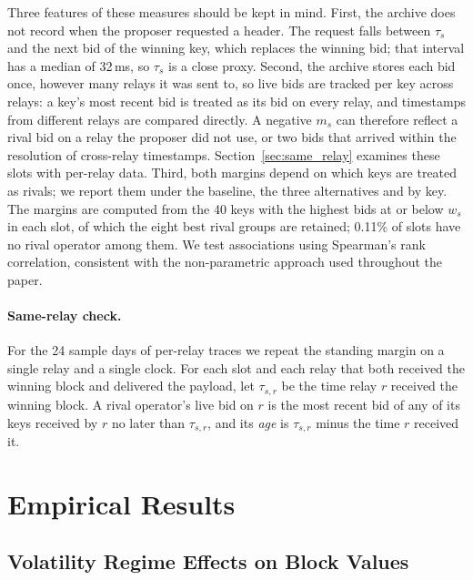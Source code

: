 \documentclass[11pt]{article}
\begin{document}
Three features of these measures should be kept in mind. First, the archive
does not record when the proposer requested a header. The request falls
between $\tau_s$ and the next bid of the winning key, which replaces the
winning bid; that interval has a median of 32\,ms, so $\tau_s$ is a close
proxy. Second, the archive stores each bid once, however many relays it was
sent to, so live bids are tracked per key across relays: a key's most recent
bid is treated as its bid on every relay, and timestamps from different
relays are compared directly. A negative $m_s$ can therefore reflect a rival
bid on a relay the proposer did not use, or two bids that arrived within the
resolution of cross-relay timestamps. Section~\ref{sec:same_relay} examines
these slots with per-relay data. Third, both margins depend on which keys
are treated as rivals; we report them under the baseline, the three
alternatives and by key. The margins are computed from the 40 keys with the
highest bids at or below $w_s$ in each slot, of which the eight best rival
groups are retained; 0.11\% of slots have no rival operator among them. We
test associations using Spearman's rank correlation, consistent with the
non-parametric approach used throughout the paper.

\paragraph{Same-relay check.} For the 24 sample days of per-relay traces we
repeat the standing margin on a single relay and a single clock. For each
slot and each relay that both received the winning block and delivered the
payload, let $\tau_{s,r}$ be the time relay $r$ received the winning block.
A rival operator's live bid on $r$ is the most recent bid of any of its
keys received by $r$ no later than $\tau_{s,r}$, and its \emph{age} is
$\tau_{s,r}$ minus the time $r$ received it.

\section{Empirical Results}
\label{sec:results}

\subsection{Volatility Regime Effects on Block Values}
\label{sec:vol_regimes}
\end{document}
